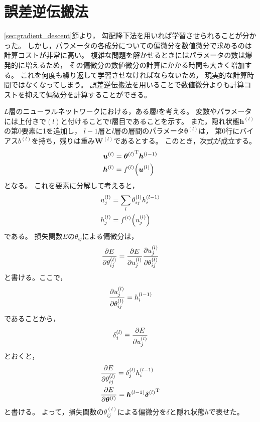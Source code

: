 \documentclass[class=jsarticle, crop=false, dvipdfmx, fleqn]{standalone}
\begin{document}
\section{誤差逆伝搬法}

\ref{sec:gradient_descent}節より，
勾配降下法を用いれば学習させられることが分かった。
しかし，パラメータの各成分についての偏微分を数値微分で求めるのは計算コストが非常に高い。
複雑な問題を解かせるときにはパラメータの数は爆発的に増えるため，
その偏微分の数値微分の計算にかかる時間も大きく増加する。
これを何度も繰り返して学習させなければならないため，
現実的な計算時間ではなくなってしまう。
誤差逆伝搬法を用いることで数値微分よりも計算コストを抑えて偏微分を計算することができる。

$L$層のニューラルネットワークにおける，ある層$l$を考える。
変数やパラメータには上付きで$(l)$と付けることで$l$層目であることを示す。
また，隠れ状態$\bm{h}^{(l)}$の第0要素に1を追加し，
$l-1$層と$l$層の層間のパラメータ$\bm{\theta}^{(l)}$は，
第0行にバイアス$b^{(l)}$を持ち，残りは重み$\bm{W}^{(l)}$であるとする。
このとき，次式が成立する。
\begin{align}
& \bm{u}^{(l)} = {\bm{\theta}^{(l)}}^{\mathrm{T}} \bm{h}^{(l-1)} \\
& \bm{h}^{(l)} = f^{(l)} \qty(\bm{u}^{(l)})
\end{align}
となる。
これを要素に分解して考えると，
\begin{align}
& u_j^{(l)} = \sum_i \theta_{ij}^{(l)} h_i^{(l-1)} \\
& h_j^{(l)} = f^{(l)} \qty(u_j^{(l)})
\end{align}
である。
損失関数$E$の$\theta_{ij}$による偏微分は，
\begin{equation}
\pdv{E}{\theta_{ij}^{(l)}} = \pdv{E}{u_j^{(l)}} \pdv{u_j^{(l)}}{\theta_{ij}^{(l)}}
\end{equation}
と書ける。ここで，
\begin{equation}
\pdv{u_j^{(l)}}{\theta_{ij}^{(l)}} = h_i^{(l-1)}
\end{equation}
であることから，
\begin{equation}
\delta_j^{(l)} \equiv \pdv{E}{u_j^{(l)}}
\label{eq:def:delta}
\end{equation}
とおくと，
\begin{align}
& \pdv{E}{\theta_{ij}^{(l)}} = \delta_j^{(l)} h_i^{(l-1)} \\
& \pdv{E}{\bm{\theta}^{(l)}} = \bm{h}^{(l-1)} {\bm{\delta}^{(l)}}^\mathrm{T}
\label{eq:pdv_param}
\end{align}
と書ける。
よって，損失関数の$\theta_{ij}^{(l)}$による偏微分を$\delta$と隠れ状態$h$で表せた。
\end{document}
